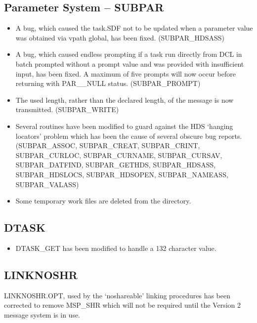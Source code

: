 \subsection{Parameter System -- SUBPAR}
\begin{itemize}
\item A bug, which caused the task.SDF not to be updated when a parameter
value was obtained via vpath global, has been fixed. (SUBPAR\-\_HDSASS)

\item A bug, which caused endless prompting if a task run directly from DCL
in batch prompted without a prompt value and was provided with insufficient
input, has been fixed. A maximum of five prompts will now occur before
returning with PAR\_\_NULL status. (SUBPAR\-\_PROMPT)

\item The used length, rather than the declared length, of the message is
now transmitted. (SUBPAR\-\_WRITE)

\item Several routines have been modified to guard against the HDS `hanging
locators' problem which has been the cause of several obscure bug reports.
(SUBPAR\-\_ASSOC,
SUBPAR\-\_CREAT,
SUBPAR\-\_CRINT,
SUBPAR\-\_CUR\-LOC,
SUBPAR\-\_CUR\-NAME,
SUBPAR\-\_CUR\-SAV,
SUBPAR\-\_DAT\-FIND,
SUBPAR\-\_GET\-HDS,
SUBPAR\-\_HDS\-ASS,
SUBPAR\-\_HDS\-LOCS,
SUBPAR\-\_HDS\-OPEN,
SUBPAR\-\_NAME\-ASS,
SUBPAR\-\_VAL\-ASS)

\item Some temporary work files are deleted from the directory.

\end{itemize}

\subsection{DTASK}
\label{dtask}
\begin{itemize}
\item DTASK\_GET has been modified to handle a 132 character value.
\end{itemize}

\subsection{LINKNOSHR}
LINKNOSHR.OPT, used by the `noshareable' linking procedures has been
corrected to remove MSP\_SHR which will not be required until the Version 2
message system is in use.

